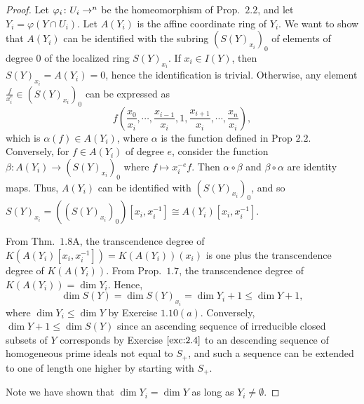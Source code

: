 \documentclass[12pt,letterpaper]{article}
\theoremstyle{definition}
\theoremstyle{remark}
\numberwithin{equation}{section}
\numberwithin{figure}{problem}
\let\AA\relax
\DeclareMathOperator{\AA}{\mathbb{A}}
\begin{document}
\begin{proof}
  Let $\varphi_i\colon U_i \to \AA^n$ be the homeomorphism of Prop.~$2.2$, and
  let $Y_i = \varphi(Y \cap U_i)$.
  Let $A(Y_i)$ is the affine coordinate ring of $Y_i$.
  We want to show that $A(Y_i)$ can be identified with the subring
  $(S(Y)_{x_i})_0$ of elements of degree $0$ of the localized ring $S(Y)_{x_i}$.
  If $x_i \in I(Y)$, then $S(Y)_{x_i} = A(Y_i) = 0$, hence the identification is
  trivial. Otherwise, any element $\frac{f}{x_i^e} \in (S(Y)_{x_i})_0$ can be
  expressed as
  \[
    f\left(\frac{x_0}{x_i}, \cdots, \frac{x_{i-1}}{x_i}, 1, \frac{x_{i+1}}{x_i},
    \cdots, \frac{x_n}{x_i}\right),
  \]
  which is $\alpha(f) \in A(Y_i)$, where $\alpha$ is the function defined in Prop
  $2.2$. Conversely, for $f \in A(Y_i)$ of degree $e$, consider the function
  $\beta\colon A(Y_i) \to (S(Y)_{x_i})_0$ where $f \mapsto x_i^{-e}f$. Then
  $\alpha \circ \beta$ and $\beta \circ \alpha$ are identity maps. Thus,
  $A(Y_i)$ can be identified with $(S(Y)_{x_i})_0$, and so $S(Y)_{x_i} =
  ((S(Y)_{x_i})_0)[x_i, x_i^{-1}] \cong A(Y_i)[x_i, x_i^{-1}]$.
  \par From Thm.~$1.8$A, the transcendence degree of $K(A(Y_i)[x_i, x_i^{-1}]) =
  K(A(Y_i))(x_i)$ is one plus the transcendence degree of $K(A(Y_i))$. From
  Prop.~$1.7$, the transcendence degree of $K(A(Y_i)) = \dim Y_i$. Hence,  
  \[\dim S(Y) = \dim S(Y)_{x_i} = \dim Y_i + 1 \le \dim Y+1,\]
  where $\dim Y_i \le \dim Y$ by Exercise $1.10(a)$. Conversely, $\dim Y + 1 \le
  \dim S(Y)$ since an ascending sequence of irreducible closed subsets of $Y$
  corresponds by Exercise $\ref{exc:2.4}$ to an descending sequence of
  homogeneous prime ideals not equal to $S_+$, and such a sequence can be
  extended to one of length one higher by starting with $S_+$.
  \par Note we have shown that $\dim Y_i = \dim Y$ as long as $Y_i \ne
  \emptyset$.
\end{proof}
\end{document}
